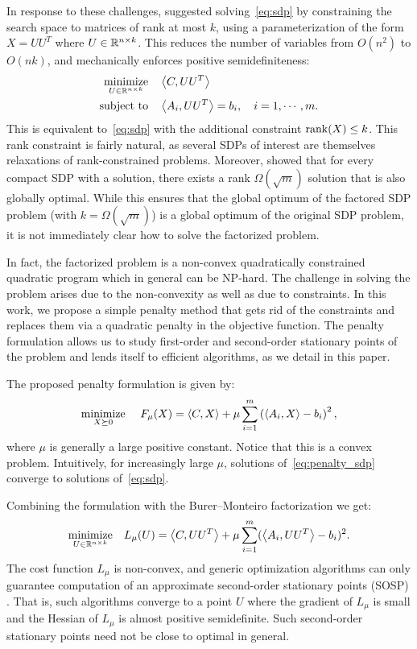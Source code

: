 In response to these challenges, \citet{burer2003nonlinear, burer2005local} suggested solving~\eqref{eq:sdp} by constraining the search space to matrices of rank at most $k$, using a parameterization of the form $X = UU^T$ where $U \in \mathbb{R}^{n\times k}$. This reduces the number of variables from $O(n^2)$ to $O(nk)$, and mechanically enforces positive semidefiniteness:
\begin{align}
	\underset{U \in \mathbb{R}^{n\times k}}{\operatorname*{\mathrm{minimize}}} \quad & \left\langle C, UU^T \right\rangle \nonumber \\
	\text{subject to} \quad & \left\langle A_i, UU^T \right\rangle = b_i,\quad i = 1,\cdots, m.
	\label{eq:factored}
\end{align}
This is equivalent to~\eqref{eq:sdp} with the additional constraint $\operatorname{rank}(X) \leq k$. This rank constraint is fairly natural, as several SDPs of interest are themselves relaxations of rank-constrained problems. Moreover, \citet{barvinok1995problems, pataki1998rank} showed that for every compact SDP with a solution, there exists a rank $\Omega(\sqrt{m})$ solution that is also globally optimal. While this ensures that the global optimum of the factored SDP problem (with $k=\Omega(\sqrt{m})$) is a global optimum of the original SDP problem, it is not immediately clear how to solve the factorized problem. 

In fact, the factorized problem is a non-convex quadratically constrained quadratic program which in general can be NP-hard. The challenge in solving the problem arises due to the non-convexity as well as due to constraints. In this work, we propose a simple penalty method that gets rid of the constraints and replaces them via a quadratic penalty in the objective function. The penalty formulation allows us to study first-order and second-order stationary points of the problem and lends itself to efficient algorithms, as we detail in this paper.


The proposed penalty formulation is given by: 
\begin{align}
	\underset{X \succeq 0}{\operatorname*{\mathrm{minimize}}} ~\quad F_{\mu}(X) =  \left\langle C, X \right\rangle + \mu \sum_{i=1}^m \left(\left\langle A_i, X \right\rangle -b_i\right)^2,
	\label{eq:penalty_sdp}
\end{align}
where $\mu$ is generally a large positive constant. Notice that this is a convex problem. Intuitively, for increasingly large $\mu$, solutions of~\eqref{eq:penalty_sdp} converge to solutions of~\eqref{eq:sdp}.

Combining the formulation with the Burer--Monteiro factorization we get:
\begin{align}
	\underset{U \in \mathbb{R}^{n\times k}}{\operatorname*{\mathrm{minimize}}} \quad  L_{\mu}(U) =  \left\langle C, UU^T \right\rangle + \mu \sum_{i=1}^m (\left\langle A_i, UU^T \right\rangle -b_i)^2.
	\label{eq:penalty_factored}
\end{align}
The cost function $L_{\mu}$ is non-convex, and generic optimization algorithms can only guarantee computation of an approximate second-order stationary points (SOSP) \citep{cartis2012complexity,ge2015escaping}. That is, such algorithms converge to a point $U$ where the gradient of $L_\mu$ is small and the Hessian of $L_\mu$ is almost positive semidefinite. Such second-order stationary points need not be close to optimal in general.

